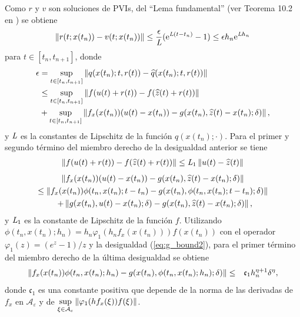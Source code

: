 Como $r$ y $v$ son soluciones de PVIs, del ``Lema fundamental'' (ver Teorema 10.2 en \cite{hairer1993solving}) se obtiene
\begin{equation}
    \left\lVert r(t;x(t_n))-v(t;x(t_n)) \right\rVert \leq \frac{\epsilon}{\emph{L}}(\mathrm{e}^{\emph{L}(t-t_n)}-1)\leq \epsilon h_n \mathrm{e}^{\emph{L}h_n} \label{ineq:bound1}
\end{equation}
para $t\in[t_n,t_{n+1}]$, donde
\begin{align*}
    \epsilon & =  \sup\limits_{t\in[t_n,t_{n+1}]}\left\lVert q(x(t_n);t,r(t))-\widehat{q}(x(t_n);t,r(t)) \right\rVert\\
    &\leq \sup\limits_{t\in[t_n,t_{n+1}]} \left\lVert f(u(t)+r(t))-f(\widehat{z}(t)+r(t)) \right\rVert\\ 
    & + \sup\limits_{t\in[t_n,t_{n+1}]} \left\lVert f_x(x(t_n))(u(t)-x(t_n))-g(x(t_n),\widehat{z}(t)-x(t_n);\delta) \right\rVert,
\end{align*}
y $\emph{L}$ es la constantes de Lipschitz de la función $q(x(t_n);\cdotp)$. Para el primer y segundo término del miembro derecho de la desigualdad anterior  se tiene
\begin{align}
    \left\lVert f(u(t)+r(t))-f(\widehat{z}(t)+r(t)) \right\rVert \leq  \emph{L}_1\left\lVert u(t)-\widehat{z}(t) \right\rVert \label{termino1}
\end{align}
\begin{multline}
    \left\lVert f_x(x(t_n))(u(t)-x(t_n))-g(x(t_n),\widehat{z}(t)-x(t_n);\delta) \right\rVert \\
    \leq \left\lVert f_x(x(t_n))\phi(t_n,x(t_n);t-t_n)-g(x(t_n),\phi(t_n,x(t_n);t-t_n);\delta)  \right\rVert \\
    \enspace+ \left\lVert g(x(t_n),u(t)-x(t_n);\delta)-g(x(t_n),\widehat{z}(t)-x(t_n);\delta) \right\rVert,
    \label{termino2}
\end{multline}
y $\emph{L}_1$ es la constante de Lipschitz de la función $f$. Utilizando  $\phi(t_n,x(t_n);h_n)=h_n\varphi_1(h_n f_x(x(t_n)))f(x(t_n))$ con el operador $\varphi_1(z)=(e^z-1)/z$ y la desigualdad (\ref{eq:g_bound2}), para el primer término del miembro derecho de la última desigualdad se obtiene
\begin{eqnarray}
    \left\lVert  f_x(x(t_n))\phi(t_n,x(t_n);h_n) -g(x(t_n),\phi(t_n,x(t_n);h_n);\delta)  \right\rVert &  \leq & \mathfrak{c}_1 h_n^{\eta+1}\delta^{\eta}, \label{termino3}
\end{eqnarray}
donde  $\mathfrak{c}_1$ es una constante positiva que depende de la norma de las derivadas de $f_x$ en  $\mathcal{A}_\varepsilon$ y de $\sup\limits_{\xi\in \mathcal{A}_\varepsilon} \left\lVert \varphi_1(h f_x(\xi))f(\xi) \right\rVert$.

